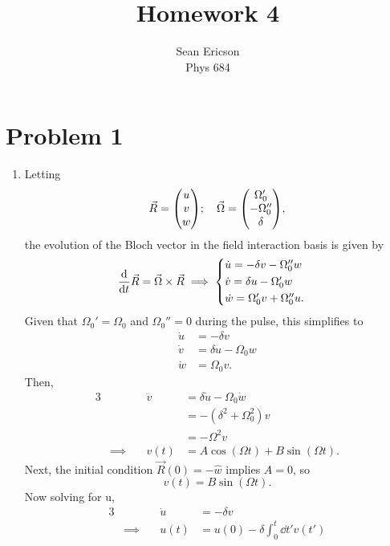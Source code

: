 \documentclass[12pt]{article}
\begin{document}
	
\title{Homework 4}
\author{Sean Ericson \\ Phys 684}
\maketitle

\section*{Problem 1}
\begin{enumerate}[label=(\alph*)]
    \item Letting
    \[ \vec{R} = \mqty(u\\v\\w); \quad \vec{\Omega} = \mqty(\Omega'_0\\-\Omega''_0\\\delta), \] 
    the evolution of the Bloch vector in the field interaction basis is given by
    \[
        \dv{t}\vec{R} = \vec{\Omega}\times\vec{R} \implies
        \begin{cases*}
            \dot{u} = -\delta v - \Omega_0'' w & \\
            \dot{v} = \delta u -\Omega_0' w & \\
            \dot{w} = \Omega_0' v + \Omega_0'' u. & \\
        \end{cases*} 
    \]
    Given that $\Omega_0' = \Omega_0$ and $\Omega_0'' = 0$ during the pulse, this simplifies to
    \begin{align*}
        \dot{u} &= -\delta v \\
        \dot{v} &= \delta u -\Omega_0 w \\
        \dot{w} &= \Omega_0 v.
    \end{align*}
    Then,
    \begin{alignat*}{3}
        &\quad & \ddot{v} &= \delta\dot{u} -\Omega_0\dot{w} \\
        &\quad & &= -\left(\delta^2 + \Omega_0^2\right)v \\
        &\quad & &= -\Omega^2v \\
        &\implies\quad & v(t) &= A\cos(\Omega t) + B\sin(\Omega t).
    \end{alignat*}
    Next, the initial condition $\vec{R}(0) = -\hat{w}$ implies $A = 0$, so
    \[ v(t) = B\sin(\Omega t). \]
    Now solving for u,
    \begin{alignat*}{3}
        &\quad & \dot{u} &= -\delta v \\
        &\implies\quad & u(t) &= u(0) - \delta\int_0^t\dd t' v(t') \\

\end{alignat*}
\end{enumerate}
\end{document}
